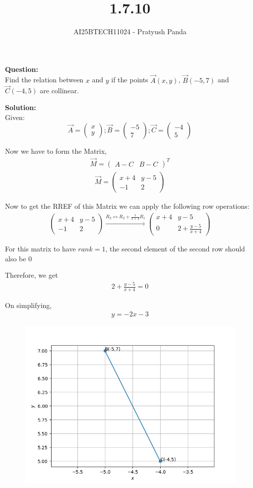 \documentclass{beamer}
\title{1.7.10}
\author{AI25BTECH11024 - Pratyush Panda}
\theoremstyle{remark}
\newcommand{\myvec}[1]{\ensuremath{\begin{pmatrix}#1\end{pmatrix}}}
\numberwithin{equation}{section}
\begin{document}
\maketitle

\textbf{Question: }\\
Find the relation between $x$ and $y$ if the points $\Vec{A}(x, y)$, $\Vec{B}(-5, 7)$ and $\Vec{C}(-4, 5)$ are collinear.

\textbf{Solution: } \\
Given:
$$
\Vec{A}=\myvec{x \\ y} ; \Vec{B}=\myvec{-5 \\ 7} ; \Vec{C}=\myvec{-4 \\ 5}
$$

Now we have to form the Matrix,\\
\begin{align}
\Vec{M}=\myvec{A-C & B-C}^T
\end{align}
\begin{align}
\Vec{M}=\myvec{x+4 & y-5 \\ -1 & 2}
\end{align}

Now to get the RREF of this Matrix we can apply the following row operations:
\begin{align}
\myvec{x+4 & y-5 \\ -1 & 2} \xrightarrow{R_2 \longleftrightarrow R_2 + \frac{1}{x+4}R_1} \myvec{x+4 & y-5 \\ 0 & 2 + \frac{y-5}{x+4}}
\end{align}

For this matrix to have $rank=1$, the second element of the second row should also be $0$

Therefore, we get
\begin{align}
2 + \frac{y-5}{x+4} = 0
\end{align}

On simplifying,
\begin{align}
y = -2x -3
\end{align}

\begin{figure}[H]
\centering
\includegraphics[width=0.6\columnwidth]{figs/img.png}
\caption*{}
\end{figure}
\end{document}
